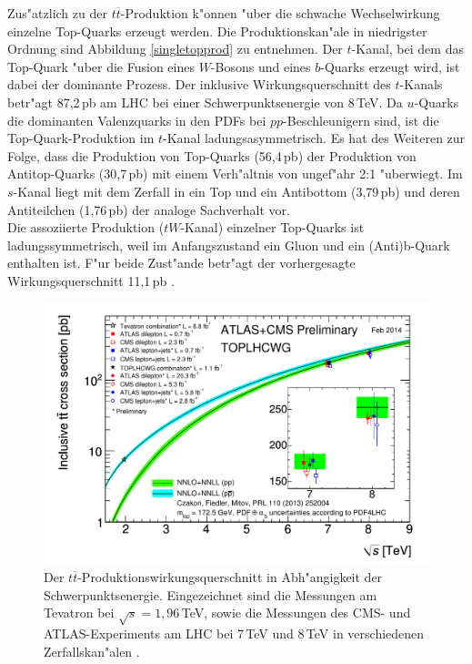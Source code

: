 Zus"atzlich zu der $t\overline{t}$-Produktion k"onnen "uber die schwache Wechselwirkung einzelne Top-Quarks erzeugt werden. Die Produktionskan"ale in niedrigster Ordnung sind Abbildung \ref{singletopprod} zu entnehmen. Der $t$-Kanal, bei dem das Top-Quark "uber die Fusion eines $W$-Bosons und eines $b$-Quarks erzeugt wird, ist dabei der dominante Prozess. Der inklusive Wirkungsquerschnitt des $t$-Kanals betr"agt 87,2\,pb am LHC bei einer Schwerpunktsenergie von 8\,TeV. Da $u$-Quarks die dominanten Valenzquarks in den PDFs bei $pp$-Beschleunigern sind, ist die Top-Quark-Produktion im $t$-Kanal ladungsasymmetrisch. Es hat des Weiteren zur Folge, dass die Produktion von Top-Quarks (56,4\,pb) der Produktion von Antitop-Quarks (30,7\,pb) mit einem Verh"altnis von ungef"ahr 2:1 "uberwiegt. Im $s$-Kanal liegt mit dem Zerfall in ein Top und ein Antibottom (3,79\,pb) und deren Antiteilchen (1,76\,pb) der analoge Sachverhalt vor.\\
Die assoziierte Produktion ($tW$-Kanal) einzelner Top-Quarks ist ladungssymmetrisch, weil im Anfangszustand ein Gluon und ein (Anti)b-Quark enthalten ist. F"ur beide Zust"ande betr"agt der vorhergesagte Wirkungsquerschnitt 11,1\,pb \cite{Kidonakis:1449411}.

\begin{figure}[ht]
	\centering
	\includegraphics[scale=0.70]{Theorie/ttproductioncrosssection_new.pdf}
	\caption[Der $t\overline{t}$-Produktionswirkungsquerschnitt in Abh"angigkeit der Schwer\-punkts\-energie]{Der $t\overline{t}$-Produktionswirkungsquerschnitt in Abh"angigkeit der Schwer\-punkts\-energie. Eingezeichnet sind die Messungen am Tevatron bei $\sqrt{s}=1,96$\,TeV, sowie die Messungen des CMS- und ATLAS-Experiments am LHC bei 7\,TeV und 8\,TeV in verschiedenen Zerfallskan"alen \cite{prodcrosssectionatlascms}.}
	\label{ttprodcross}
\end{figure}


